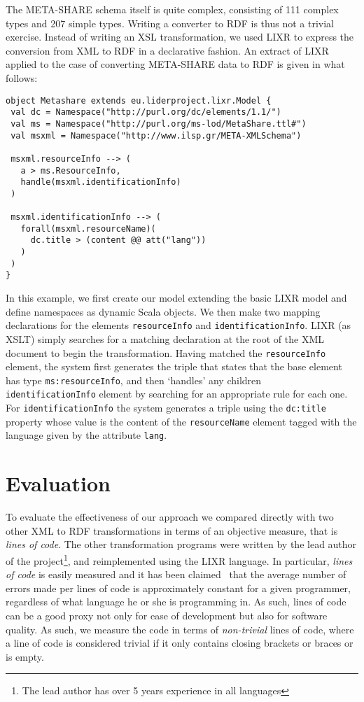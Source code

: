 \documentclass{acm_proc_article-sp}
\begin{document}
The META-SHARE schema itself is quite complex, consisting of 111 complex types
and 207 simple types.
Writing a\textsc{} converter to RDF is thus not a trivial exercise. Instead of writing an
XSL transformation, we used LIXR to express the conversion from XML to RDF in a declarative fashion.
An extract of LIXR applied to the case of converting META-SHARE data to RDF is given in what follows:

{\scriptsize
\begin{verbatim}
object Metashare extends eu.liderproject.lixr.Model {
 val dc = Namespace("http://purl.org/dc/elements/1.1/")
 val ms = Namespace("http://purl.org/ms-lod/MetaShare.ttl#")
 val msxml = Namespace("http://www.ilsp.gr/META-XMLSchema")

 msxml.resourceInfo --> (
   a > ms.ResourceInfo,
   handle(msxml.identificationInfo)
 )

 msxml.identificationInfo --> (
   forall(msxml.resourceName)(
     dc.title > (content @@ att("lang"))
   )
 )
}
\end{verbatim}}
In this example, we first create our model extending the basic LIXR model and
define namespaces as dynamic Scala objects. We then make two mapping
declarations for the elements {\tt resourceInfo} and {\tt identifi\-cationInfo}. LIXR (as
XSLT) simply searches for a matching declaration at the root of the XML document
to begin the transformation. Having matched the {\tt resourceInfo} element, the system
first generates the triple that states that the base element has type
{\tt ms:resourceInfo}, and then `handles' any children {\tt
identi\-ficationInfo} element by
searching for an appropriate rule for each one. For {\tt identificationInfo} the
system generates a triple using the {\tt dc:title} property whose value is the
content of the {\tt resourceName} element tagged with the language given by the
attribute {\tt lang}.


\section{Evaluation}
\label{sec:results}


To evaluate the effectiveness of our approach we compared directly with two other
XML to RDF transformations in terms of an objective measure, that is \emph{lines of code}. The other transformation programs were written by the lead author of the
project\footnote{The lead author has over 5 years experience in all languages}, and
reimplemented using the LIXR language.
In particular, \emph{lines of code} is easily measured and it
has been claimed~\cite{mcconnell2004code} that the average number of errors made per lines of code is 
approximately constant for a given programmer, regardless of what language he or
she is programming in. As such, lines of code can be a good proxy not only for
ease of development but also for software quality. As such, we measure the
code in terms of \emph{non-trivial} lines of code, where a line of code
is considered trivial if it only contains closing brackets or braces or is empty. 
\end{document}
